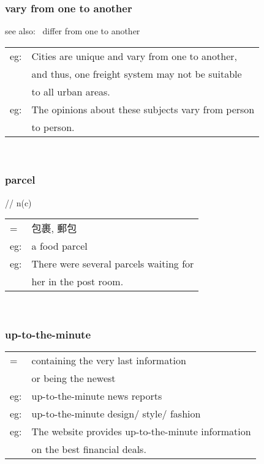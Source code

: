 \documentclass[14pt, t]{beamer}
\begin{document}
\begin{frame}
\frametitle{vary from one to another}
see also: \, differ from one to another \\[8pt]
\begin{tabular}{ll}
eg: & Cities are unique and vary from one to another, \\[1pt]
	& and thus, one freight system may not be suitable \\[1pt]
	&  to all urban areas. \\[8pt]
eg: & The opinions about these subjects vary from person \\[1pt]
	& to person. \\
\end{tabular} \\
\end{frame}
\begin{frame}
\frametitle{parcel}
// \quad n(c) \\[8pt]
\begin{tabular}{ll}
= & 包裹, 郵包 \\[8pt]
eg: & a food parcel \\[8pt]
eg: & There were several parcels waiting for \\[1pt]
	& her in the post room. \\
\end{tabular}\\
\end{frame}
\begin{frame}
\frametitle{up-to-the-minute}
\begin{tabular}{ll}
= & containing the very last information\\[1pt]
& or being the newest \\[8pt]
eg: & up-to-the-minute news reports \\[8pt]
eg: & up-to-the-minute design/ style/ fashion \\[8pt]
eg: & The website provides up-to-the-minute information \\[1pt]
& on the best financial deals. \\
\end{tabular} \\
\end{frame}
\end{document}
